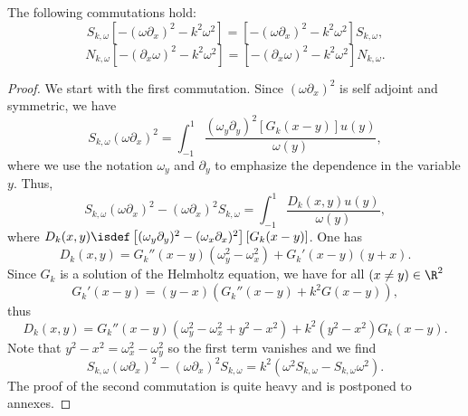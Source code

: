 \documentclass[a4paper]{article}
\begin{document}
	\begin{The}
		\label{Commutations}
		The following commutations hold:
		\[S_{k,\omega} \left[-(\omega \partial_x)^2 - k^2\omega^2\right] =  \left[-(\omega \partial_x)^2 - k^2\omega^2\right]S_{k,\omega},\]
		\[N_{k,\omega} \left[-(\partial_x \omega)^2 - k^2\omega^2\right] =  \left[-(\partial_x \omega)^2 - k^2\omega^2\right]N_{k,\omega}.\]
		\begin{proof}
			We start with the first commutation. Since $(\omega \partial_x)^2$ is self adjoint and symmetric, we have 
			\[S_{k,\omega} (\omega \partial_x)^2 = \int_{-1}^{1} \frac{(\omega_y \partial_y)^2 \left[G_k(x-y)\right] u(y)}{\omega(y)},\]
			where we use the notation $\omega_y$ and $\partial_y$ to emphasize the dependence in the variable $y$. 
			Thus, 
			\[S_{k,\omega} (\omega \partial_x)^2 - (\omega \partial_x)^2 S_{k,\omega} = \int_{-1}^{1} \frac{D_k(x,y)u(y)}{\omega(y)},\]
			where $D_k(x,y) \isdef \left[(\omega_y \partial_y)^2 - (\omega_x \partial_x)^2\right] \left[G_k(x-y)\right]$. 
			One has 
			\[D_k(x,y) = G_k''(x-y) (\omega^2_y - \omega^2_x) + G_k'(x-y)(y + x).\]
			Since $G_k$ is a solution of the Helmholtz equation, we have for all $(x \neq y) \in \R^2$ 
			\[G_k'(x-y) = (y-x)(G_k''(x-y) + k^2G(x-y)),\]
			thus
			\[D_k(x,y) = G_k''(x-y)\left(\omega^2_y - \omega_x^2 + y^2 - x^2\right) + k^2(y^2 - x^2)G_k(x-y) . \]
			Note that $y^2 - x^2 = \omega_x^2 - \omega_y^2$ so the first term vanishes and we find
			\[S_{k,\omega} (\omega \partial_x)^2 - (\omega \partial_x)^2 S_{k,\omega} =  k^2\left(\omega^2 S_{k,\omega} -S_{k,\omega} \omega^2 \right). \]
			The proof of the second commutation is quite heavy and is postponed to annexes. 
		\end{proof}
	\end{The}
	
\end{document}
